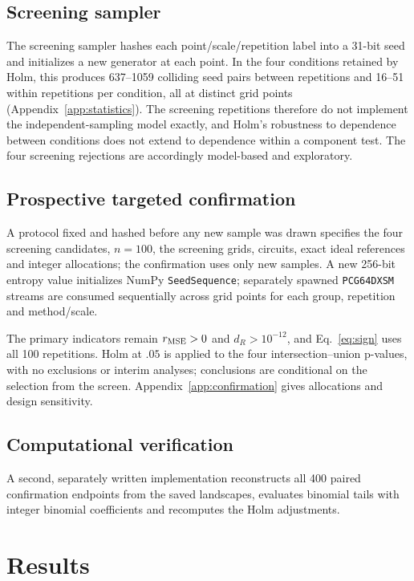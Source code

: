 \subsection{Screening sampler}\label{sec:streams}
The screening sampler hashes each point/scale/repetition label into a 31-bit seed and initializes a new generator at each point. In the four conditions retained by Holm, this produces 637--1059 colliding seed pairs between repetitions and 16--51 within repetitions per condition, all at distinct grid points (Appendix~\ref{app:statistics}). The screening repetitions therefore do not implement the independent-sampling model exactly, and Holm's robustness to dependence between conditions does not extend to dependence within a component test. The four screening rejections are accordingly model-based and exploratory.

\subsection{Prospective targeted confirmation}\label{sec:confirmation_design}
A protocol fixed and hashed before any new sample was drawn specifies the four screening candidates, $n=100$, the screening grids, circuits, exact ideal references and integer allocations; the confirmation uses only new samples. A new 256-bit entropy value initializes NumPy \texttt{SeedSequence}; separately spawned \texttt{PCG64DXSM} streams are consumed sequentially across grid points for each group, repetition and method/scale.

The primary indicators remain $r_{\operatorname{MSE}}>0$ and $d_R>10^{-12}$, and Eq.~\eqref{eq:sign} uses all 100 repetitions. Holm at $.05$ is applied to the four intersection--union p-values, with no exclusions or interim analyses; conclusions are conditional on the selection from the screen. Appendix~\ref{app:confirmation} gives allocations and design sensitivity.

\subsection{Computational verification}\label{sec:verification}
A second, separately written implementation reconstructs all 400 paired confirmation endpoints from the saved landscapes, evaluates binomial tails with integer binomial coefficients and recomputes the Holm adjustments.

\section{Results}
